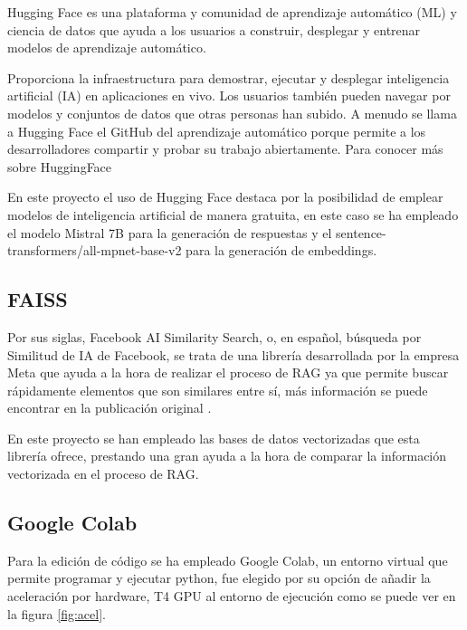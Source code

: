 Hugging Face es una plataforma y comunidad de aprendizaje automático (ML) y ciencia de datos que ayuda a los usuarios a construir, desplegar y entrenar modelos de aprendizaje automático.

Proporciona la infraestructura para demostrar, ejecutar y desplegar inteligencia artificial (IA) en aplicaciones en vivo. Los usuarios también pueden navegar por modelos y conjuntos de datos que otras personas han subido. A menudo se llama a Hugging Face el GitHub del aprendizaje automático porque permite a los desarrolladores compartir y probar su trabajo abiertamente. Para conocer más sobre HuggingFace \cite{ben_lutkevich_what_2023}

En este proyecto el uso de Hugging Face destaca por la posibilidad de emplear modelos de inteligencia artificial de manera gratuita, en este caso se ha empleado el modelo Mistral 7B para la generación de respuestas y el sentence-transformers/all-mpnet-base-v2 para la generación de embeddings.

\subsection{FAISS}

Por sus siglas, Facebook AI Similarity Search, o, en español, búsqueda por Similitud de IA de Facebook, se trata de una librería desarrollada por la empresa Meta que ayuda a la hora de realizar el proceso de RAG ya que permite buscar rápidamente elementos que son similares entre sí, más información se puede encontrar en la publicación original \cite{herve_jegou_faiss_2017}.

En este proyecto se han empleado las bases de datos vectorizadas que esta librería ofrece, prestando una gran ayuda a la hora de comparar la información vectorizada en el proceso de RAG.

\subsection{Google Colab}

Para la edición de código se ha empleado Google Colab, un entorno virtual que permite programar y ejecutar python, fue elegido por su opción de añadir la aceleración por hardware, T4 GPU al entorno de ejecución como se puede ver en la figura \ref{fig:acel}.

